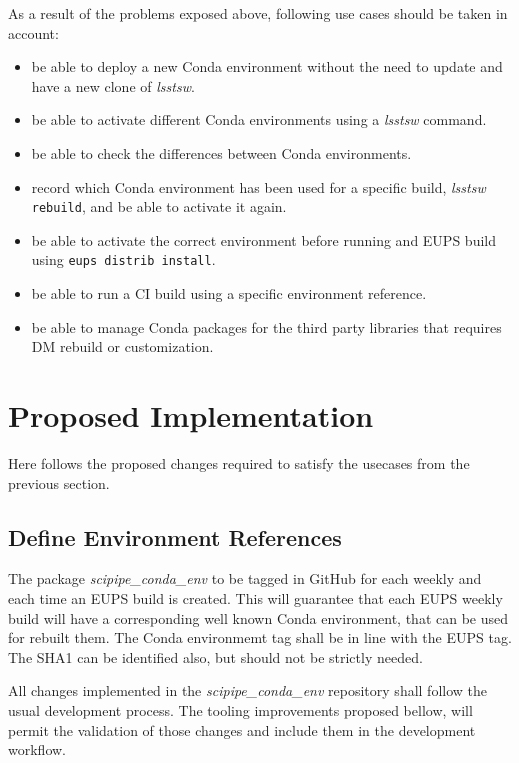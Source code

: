 As a result of the problems exposed above, following use cases should be taken in account:

\begin{itemize}
\item be able to deploy a new Conda environment without the need to update and have a new clone of \textit{lsstsw}.
\item be able to activate different Conda environments using a \textit{lsstsw} command.
\item be able to check the differences between Conda environments.
\item record which Conda environment has been used for a specific build, \textit{lsstsw} \texttt{rebuild}, and be able to activate it again.
\item be able to activate the correct environment before running and EUPS build using \texttt{eups distrib install}.
\item be able to run a CI build using a specific environment reference.
\item be able to manage Conda packages for the third party libraries that requires DM rebuild or customization.
\end{itemize}


\newpage
\section{Proposed Implementation} \label{sec:proposed}

Here follows the proposed changes required to satisfy the usecases from the previous section.

\subsection{Define Environment References} \label{sec:envDefine}

The package \textit{scipipe\_conda\_env} to be tagged in GitHub for each weekly and each time an EUPS build is created.
This will guarantee that each EUPS weekly build will have a corresponding well known Conda environment, that can be used for rebuilt them. 
The Conda environmemt tag shall be in line with the EUPS tag. The SHA1 can be identified also, but should not be strictly needed.

All changes implemented in the \textit{scipipe\_conda\_env} repository shall follow the usual development process.  
The tooling improvements proposed bellow, will permit the validation of those changes and include them in the development workflow.


